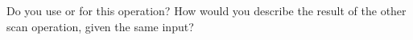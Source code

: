   Do you use  or  for this operation? How
  would you describe the result of the other scan operation, given the
  same input?
